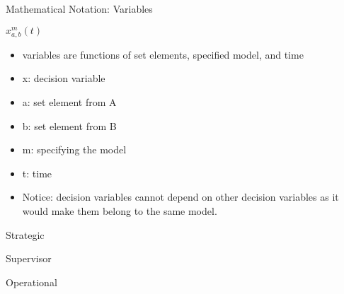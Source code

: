 \documentclass{beamer}
\begin{document}
\begin{frame}{}
    \begin{block}{Mathematical Notation: Variables}
	\par
	$ x_{a, b}^{m}(t) $ \\ 
	\begin{itemize}
		\item variables are functions of set elements, specified model, and time
		\item x: decision variable
		\item a: set element from A
		\item b: set element from B
		\item m: specifying the model
		\item t: time
		\item Notice: decision variables cannot depend on other decision variables as it would make them belong to the same model.
	\end{itemize}
    \end{block}
\end{frame}

\begin{frame}[t]{Strategic}
\end{frame}

\begin{frame}[t]{}
\end{frame}

\begin{frame}[t]{Supervisor}
\end{frame}

\begin{frame}[t]{Operational}
\end{frame}
\end{document}
